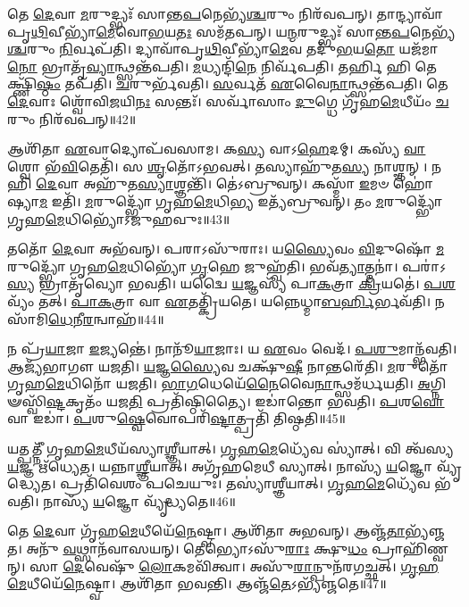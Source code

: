 𑌤𑍇 \ul{𑌦𑍇}\-𑌵𑌾 \ul{𑌮}\-𑌰𑍁𑌦𑍍𑌭𑍍𑌯𑌃᳴ 𑌸𑌾𑌨𑍍𑌤\-\ul{𑌪}\-𑌨𑍇𑌭𑍍𑌯᳴\-\ul{𑌶𑍍𑌚}\-𑌰𑍁𑌂 𑌨𑌿𑌰᳴𑌵𑌪𑌨𑍍।
𑌤𑌾𑌨𑍍𑌦𑍍𑌯𑌾𑌵𑌾᳴𑌪𑍃\-\ul{𑌥𑌿}\-𑌵𑍀\-𑌭𑍍𑌯𑌾᳴\-\ul{𑌮𑍇}\-𑌵𑍋\-\ul{𑌭}\-𑌯\-\ul{𑌤𑌃} 𑌸𑌮᳴𑌤𑌪𑌨𑍍।
𑌯\-\ul{𑌨𑍍𑌮}\-𑌰𑍁𑌦𑍍𑌭𑍍𑌯𑌃᳴ 𑌸𑌾𑌨𑍍𑌤\-\ul{𑌪}\-𑌨𑍇𑌭𑍍𑌯᳴\-\ul{𑌶𑍍𑌚}\-𑌰𑍁𑌂 \ul{𑌨𑌿}\-𑌰𑍍𑌵𑌪᳴𑌤𑌿।
𑌦𑍍𑌯𑌾𑌵𑌾᳴𑌪𑍃\-\ul{𑌥𑌿}\-𑌵𑍀𑌭𑍍𑌯𑌾᳴\-\ul{𑌮𑍇}\-𑌵 𑌤𑌦𑍁᳴\-\ul{𑌭}\-𑌯\-\ul{𑌤𑍋} 𑌯𑌜᳴𑌮𑌾\-\ul{𑌨𑍋} 𑌭𑍍𑌰𑌾𑌤𑍃᳴\-\ul{𑌵𑍍𑌯𑌾}\-𑌨𑍍𑌥𑍍𑌸𑌨𑍍𑌤᳴𑌪𑌤𑌿।
\-\ul{𑌮}\-𑌧𑍍𑌯𑌨𑍍𑌦𑌿᳴\-\ul{𑌨𑍇} 𑌨𑌿𑌰𑍍𑌵᳴𑌪𑌤𑌿।
𑌤𑌰𑍍\mbox{}\-\ul{𑌹𑌿} 𑌹𑌿 𑌤𑍇𑌕𑍍𑌷𑍍𑌣𑌿᳴\-\ul{𑌷𑍍𑌠𑌂} 𑌤𑌪᳴𑌤𑌿।
\-\ul{𑌚}\-𑌰𑍁𑌰𑍍𑌭᳴𑌵𑌤𑌿।
\-\ul{𑌸}\-𑌰𑍍𑌵𑌤᳴ \ul{𑌏}\-𑌵𑍈\-\ul{𑌨𑌾}\-𑌨𑍍𑌥𑍍𑌸𑌨𑍍𑌤᳴𑌪𑌤𑌿।
𑌤𑍇 \ul{𑌦𑍇}\-𑌵𑌾𑌃 𑌶𑍍𑌵𑍋᳴𑌵𑌿\-\ul{𑌜}\-𑌯𑌿\-\ul{𑌨𑌃} 𑌸𑌨𑍍𑌤𑌃᳴।
𑌸𑌰𑍍𑌵𑌾᳴𑌸𑌾𑌂 \ul{𑌦𑍁}\-𑌗𑍍𑌧𑍇 𑌗𑍃᳴𑌹\-\ul{𑌮𑍇}\-𑌧𑍀𑌯𑌂᳴ \ul{𑌚}\-𑌰𑍁𑌂 𑌨𑌿𑌰᳴𑌵𑌪𑌨𑍍॥42॥

𑌆𑌶𑌿᳴𑌤𑌾 \ul{𑌏}\-𑌵𑌾𑌦𑍍𑌯𑍋𑌪᳴𑌵𑌸𑌾𑌮।
𑌕\-\ul{𑌸𑍍𑌯} 𑌵𑌾𑌽\-\ul{𑌹𑍇}\-𑌦𑌮𑍍।
𑌕𑌸𑍍𑌯᳴ \ul{𑌵𑌾} 𑌶𑍍𑌵𑍋 𑌭᳴\-\ul{𑌵𑌿}\-𑌤𑍇𑌤𑌿᳴।
𑌸 \ul{𑌶𑍃}\-𑌤𑍋᳴\-𑌽𑌭𑌵𑌤𑍍।
𑌤𑌸𑍍𑌯𑌾𑌹𑍁᳴𑌤\-\ul{𑌸𑍍𑌯} 𑌨𑌾𑌶𑍍𑌞𑌨𑍍।
𑌨 𑌹𑌿 \ul{𑌦𑍇}\-𑌵𑌾 𑌅𑌹𑍁᳴𑌤\-\ul{𑌸𑍍𑌯𑌾}\-𑌶𑍍𑌞𑌨𑍍𑌤𑌿᳴।
𑌤𑍇॑𑌽𑌬𑍍𑌰𑍁𑌵𑌨𑍍।
𑌕𑌸𑍍𑌮𑌾᳴ \ul{𑌇}\-𑌮𑍞 𑌹𑍋॑𑌷𑍍𑌯𑌾\-\ul{𑌮} 𑌇𑌤𑌿᳴।
\-\ul{𑌮}\-𑌰𑍁𑌦𑍍𑌭𑍍𑌯𑍋᳴ 𑌗𑍃𑌹\-\ul{𑌮𑍇}\-𑌧𑌿\-\ul{𑌭𑍍𑌯} 𑌇𑌤𑍍𑌯᳴𑌬𑍍𑌰𑍁𑌵𑌨𑍍।
𑌤𑌂 \ul{𑌮}\-𑌰𑍁𑌦𑍍𑌭𑍍𑌯𑍋᳴ 𑌗𑍃𑌹\-\ul{𑌮𑍇}\-𑌧𑌿𑌭𑍍𑌯𑍋᳴\-𑌽𑌜𑍁𑌹𑌵𑍁𑌃॥43॥

𑌤𑌤𑍋᳴ \ul{𑌦𑍇}\-𑌵𑌾 𑌅𑌭᳴𑌵𑌨𑍍।
𑌪𑌰𑌾𑌽𑌸𑍁᳴𑌰𑌾𑌃।
𑌯\-\ul{𑌸𑍍𑌯𑍈}\-𑌵𑌂 \ul{𑌵𑌿}\-𑌦𑍁𑌷𑍋᳴ \ul{𑌮}\-𑌰𑍁𑌦𑍍𑌭𑍍𑌯𑍋᳴ 𑌗𑍃𑌹\-\ul{𑌮𑍇}\-𑌧𑌿𑌭𑍍𑌯𑍋᳴ \ul{𑌗𑍃}\-𑌹𑍇 𑌜𑍁𑌹𑍍𑌵᳴𑌤𑌿।
𑌭𑌵᳴\-\ul{𑌤𑍍𑌯𑌾}\-𑌤𑍍𑌮𑌨𑌾॑।
𑌪𑌰𑌾॑𑌽\-\ul{𑌸𑍍𑌯} 𑌭𑍍𑌰𑌾𑌤𑍃᳴𑌵𑍍𑌯𑍋 𑌭𑌵𑌤𑌿।
𑌯𑌦𑍍𑌵𑍈 \ul{𑌯}\-𑌜𑍍𑌞𑌸𑍍𑌯᳴ 𑌪𑌾\-\ul{𑌕}\-𑌤𑍍𑌰𑌾 \ul{𑌕𑍍𑌰𑌿}\-𑌯𑌤𑍇॑।
\-\ul{𑌪}\-\-\ul{𑌶}\-𑌵𑍍𑌯𑌂᳴ 𑌤𑌤𑍍।
\-\ul{𑌪𑌾}\-\-\ul{𑌕}\-𑌤𑍍𑌰𑌾 𑌵𑌾 \ul{𑌏}\-𑌤𑌤𑍍𑌕𑍍𑌰𑌿᳴𑌯𑌤𑍇।
𑌯𑌨𑍍𑌨𑍇𑌧𑍍𑌮𑌾\-\ul{𑌬}\-\-\ul{𑌰𑍍}\-𑌹𑌿𑌰𑍍𑌭𑌵᳴𑌤𑌿।
𑌨 𑌸𑌾᳴𑌮𑌿\-\ul{𑌧𑍇}\-𑌨𑍀\-\ul{𑌰}\-𑌨𑍍𑌵𑌾𑌹᳴॥44॥

𑌨 𑌪𑍍𑌰᳴\-\ul{𑌯𑌾}\-𑌜𑌾 \ul{𑌇}\-𑌜𑍍𑌯𑌨𑍍𑌤𑍇॑।
𑌨𑌾𑌨𑍂᳴\-\ul{𑌯𑌾}\-𑌜𑌾𑌃।
𑌯 \ul{𑌏}\-𑌵𑌂 𑌵𑍇𑌦᳴।
\-\ul{𑌪}\-\-\ul{𑌶𑍁}\-𑌮𑌾𑌨𑍍𑌭᳴𑌵𑌤𑌿।
𑌆𑌜𑍍𑌯᳴𑌭𑌾𑌗𑍗 𑌯𑌜𑌤𑌿।
\-\ul{𑌯}\-𑌜𑍍𑌞\-\ul{𑌸𑍍𑌯𑍈}\-𑌵 𑌚𑌕𑍍𑌷𑍁᳴\-\ul{𑌷𑍀} 𑌨𑌾𑌨𑍍𑌤𑌰𑍇᳴𑌤𑌿।
\-\ul{𑌮}\-𑌰𑍁𑌤𑍋᳴ 𑌗𑍃𑌹\-\ul{𑌮𑍇}\-𑌧𑌿𑌨𑍋᳴ 𑌯𑌜𑌤𑌿।
\-\ul{𑌭𑌾}\-\-\ul{𑌗}\-𑌧𑍇𑌯𑍇᳴\-\ul{𑌨𑍈}\-𑌵𑍈\-\ul{𑌨𑌾}\-𑌨𑍍𑌥𑍍𑌸𑌮᳴𑌰𑍍𑌧\-𑌯𑌤𑌿।
\-\ul{𑌅}\-𑌗𑍍𑌨𑌿𑍟𑌸𑍍𑌵𑌿᳴\-\ul{𑌷𑍍𑌟}\-𑌕𑍃𑌤𑌂᳴ 𑌯𑌜\-\ul{𑌤𑌿} 𑌪𑍍𑌰𑌤𑌿᳴\-𑌷𑍍𑌠𑌿𑌤𑍍𑌯𑍈।
𑌇𑌡𑌾॑𑌨𑍍𑌤𑍋 𑌭𑌵𑌤𑌿।
\-\ul{𑌪}\-𑌶\-\ul{𑌵𑍋} 𑌵𑌾 𑌇𑌡𑌾॑।
\-\ul{𑌪}\-𑌶𑍁\-\ul{𑌷𑍍𑌵𑍇}\-𑌵𑍋𑌪𑌰𑌿᳴\-\ul{𑌷𑍍𑌟𑌾}\-𑌤𑍍𑌪𑍍𑌰𑌤𑌿᳴ 𑌤𑌿𑌷𑍍𑌠𑌤𑌿॥45॥

𑌯𑌤𑍍𑌪𑌤𑍍𑌨𑍀᳴ 𑌗𑍃𑌹\-\ul{𑌮𑍇}\-𑌧𑍀𑌯᳴𑌸𑍍𑌯𑌾\-\ul{𑌶𑍍𑌞𑍀}\-𑌯𑌾𑌤𑍍।
\-\ul{𑌗𑍃}\-\-\ul{𑌹}\-\-\ul{𑌮𑍇}\-𑌧𑍍𑌯𑍇᳴𑌵 𑌸𑍍𑌯𑌾॑𑌤𑍍।
𑌵𑌿 𑌤𑍍𑌵᳴𑌸𑍍𑌯 \ul{𑌯}\-𑌜𑍍𑌞 𑌋᳴𑌧𑍍𑌯𑍇𑌤।
𑌯𑌨𑍍𑌨𑌾\-\ul{𑌶𑍍𑌞𑍀}\-𑌯𑌾𑌤𑍍।
𑌅𑌗𑍃᳴𑌹𑌮𑍇𑌧𑍀 𑌸𑍍𑌯𑌾𑌤𑍍।
𑌨𑌾𑌸𑍍𑌯᳴ \ul{𑌯}\-𑌜𑍍𑌞𑍋 𑌵𑍍𑌯𑍃᳴𑌦𑍍𑌧𑍍𑌯𑍇𑌤।
𑌪𑍍𑌰𑌤𑌿᳴\-𑌵𑍇𑌶𑌂 𑌪𑌚𑍇𑌯𑍁𑌃।
𑌤𑌸𑍍𑌯𑌾॑𑌶𑍍𑌞𑍀𑌯𑌾𑌤𑍍।
\-\ul{𑌗𑍃}\-\-\ul{𑌹}\-\-\ul{𑌮𑍇}\-𑌧𑍍𑌯𑍇᳴𑌵 𑌭᳴𑌵𑌤𑌿।
𑌨𑌾𑌸𑍍𑌯᳴ \ul{𑌯}\-𑌜𑍍𑌞𑍋 𑌵𑍍𑌯𑍃᳴𑌦𑍍𑌧𑍍𑌯𑌤𑍇॥46॥

𑌤𑍇 \ul{𑌦𑍇}\-𑌵𑌾 𑌗𑍃᳴𑌹\-\ul{𑌮𑍇}\-𑌧𑍀𑌯𑍇᳴\-\ul{𑌨𑍇}\-𑌷𑍍𑌟𑍍𑌵𑌾।
𑌆𑌶𑌿᳴𑌤𑌾 𑌅𑌭𑌵𑌨𑍍।
𑌆𑌞𑍍𑌜᳴\-\ul{𑌤𑌾}\-𑌭𑍍𑌯᳴𑌞𑍍𑌜𑌤।
𑌅𑌨𑍁᳴ \ul{𑌵}\-𑌥𑍍𑌸𑌾𑌨᳴𑌵𑌾𑌸𑌯𑌨𑍍।
𑌤𑍇𑌭𑍍𑌯𑍋\-𑌽𑌸𑍁᳴\-\ul{𑌰𑌾𑌃} 𑌕𑍍𑌷𑍁\-\ul{𑌧𑌂} 𑌪𑍍𑌰𑌾𑌹𑌿᳴𑌣𑍍𑌵𑌨𑍍।
𑌸𑌾 \ul{𑌦𑍇}\-𑌵𑍇𑌷𑍁᳴ \ul{𑌲𑍋}\-𑌕𑌮𑌵𑌿᳴𑌤𑍍𑌵𑌾।
𑌅𑌸𑍁᳴\-\ul{𑌰𑌾}\-𑌨𑍍𑌪𑍁𑌨᳴𑌰𑌗𑌚𑍍𑌛𑌤𑍍।
\-\ul{𑌗𑍃}\-\-\ul{𑌹}\-\-\ul{𑌮𑍇}\-𑌧𑍀𑌯𑍇᳴\-\ul{𑌨𑍇}\-𑌷𑍍𑌟𑍍𑌵𑌾।
𑌆𑌶𑌿᳴𑌤𑌾 𑌭𑌵𑌨𑍍𑌤𑌿।
𑌆𑌞𑍍𑌜᳴\-\ul{𑌤𑍇}\-\-𑌽𑌭𑍍𑌯᳴𑌞𑍍𑌜𑌤𑍇॥47॥

